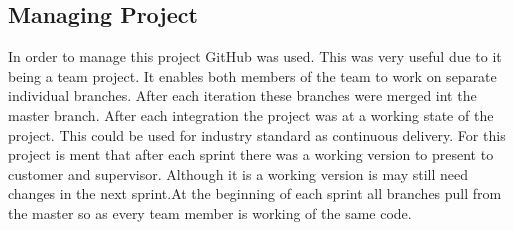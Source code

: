 \subsection{Managing Project}
In order to manage this project GitHub was used. This was very useful due to it being a team project. It enables both members of the team to work on separate individual branches. After each iteration these branches were merged int the master branch. After each integration the project was at a working state of the project. This could be used for industry standard as continuous delivery. For this project is ment that after each sprint there was a working version to present to customer and supervisor. Although it is a working version is may still need changes in the next sprint.At the beginning of each sprint all branches pull from the master so as every team member is working of the same code.






 


